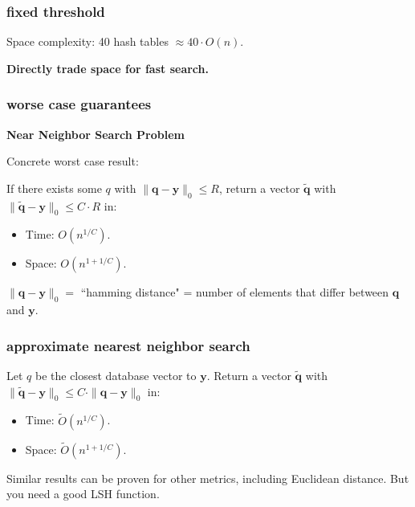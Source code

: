 \documentclass[compress]{beamer}
\newcommand{\bv}[1]{\mathbf{#1}}
\begin{document}
\begin{frame}
	\frametitle{fixed threshold}
	\begin{center}
	Space complexity: 40 hash tables \alert{$\approx 40\cdot O(n)$}. 
	
	\textbf{Directly trade space for fast search.}
	\end{center}
\end{frame}

\begin{frame}
	\frametitle{worse case guarantees}
	\begin{center}
	\textbf{Near Neighbor Search Problem}
\end{center}

	Concrete worst case result:
	\begin{theorem}
		If there exists some $q$ with $\|\bv{q} - \bv{y}\|_0 \leq R$, return a vector $\tilde{\bv{q}}$ with $\|\tilde{\bv{q}} - \bv{y}\|_0 \leq C\cdot R$ in:
		\begin{itemize}
			\item Time: $O\left(n^{1/C}\right)$.
			\item Space: $O\left(n^{1 + 1/C}\right)$. 
		\end{itemize}
	\end{theorem}
	$\|\bv{q} - \bv{y}\|_0 = $ ``hamming distance" = number of elements that differ between $\bv{q}$ and $\bv{y}$. 
\end{frame}

\begin{frame}
	\frametitle{approximate nearest neighbor search}
		\begin{theorem}
		Let $q$ be the closest database vector to $\bv{y}$. Return a vector $\tilde{\bv{q}}$ with $\|\tilde{\bv{q}} - \bv{y}\|_0 \leq C\cdot \|{\bv{q}} - \bv{y}\|_0$ in:
		\begin{itemize}
			\item Time: $\tilde{O}\left(n^{1/C}\right)$.
			\item Space: $\tilde{O}\left(n^{1 + 1/C}\right)$. 
		\end{itemize}
	\end{theorem}
	Similar results can be proven for other metrics, including Euclidean distance. But you need a good LSH function.
\end{frame}
\end{document}
